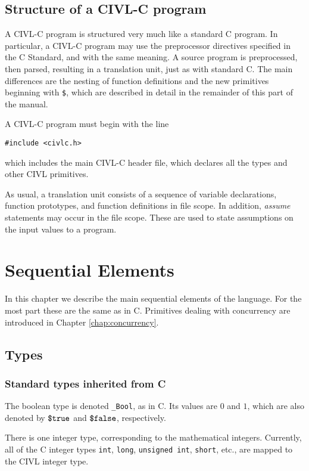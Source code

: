 \section{Structure of a CIVL-C program}

A CIVL-C program is structured very much like a standard C program.
In particular, a CIVL-C program may use the preprocessor directives
specified in the C Standard, and with the same meaning.  A source
program is preprocessed, then parsed, resulting in a translation unit,
just as with standard C.  The main differences are the nesting of
function definitions and the new primitives beginning with
\texttt{\$}, which are described in detail in the remainder of this
part of the manual.

A CIVL-C program must begin with the line
\begin{verbatim}
#include <civlc.h>
\end{verbatim}
which includes the main CIVL-C header file, which declares all the
types and other CIVL primitives.

As usual, a translation unit consists of a sequence of variable
declarations, function prototypes, and function definitions in file
scope.  In addition, \emph{assume} statements may occur in the file
scope.  These are used to state assumptions on the input values
to a program.

\chapter{Sequential Elements}

In this chapter we describe the main sequential elements of the
language.  For the most part these are the same as in C.
Primitives dealing with concurrency are introduced in Chapter
\ref{chap:concurrency}.

\section{Types}

\subsection{Standard types inherited from C}

The boolean type is denoted \verb!_Bool!, as in C. Its values are $0$
and $1$, which are also denoted by $\mbox{\texttt{\${}true}}$ and $\mbox{\texttt{\${}false}}$,
respectively.

There is one integer type, corresponding to the mathematical integers.
Currently, all of the C integer types \texttt{int}, \texttt{long},
\texttt{unsigned\ int}, \texttt{short}, etc., are mapped to the CIVL
integer type.

